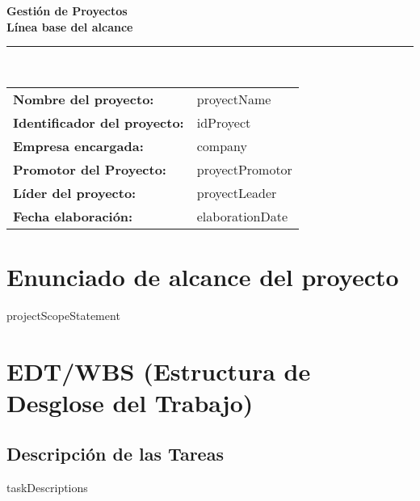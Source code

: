 \documentclass[11pt]{article}
\begin{document}
    \begin{center}
        \color{titlecolor}
        {\Huge\textbf{Gestión de Proyectos}}\\[1cm]
        {\large\textbf{Línea base del alcance}}\\[0.5cm]
        \rule{\textwidth}{1pt}\\[1.5cm]

        \begin{tabular}{>{\bfseries}ll}
            \textcolor{sectioncolor}{Nombre del proyecto:} & {{proyectName}} \\[0.4cm]
            \textcolor{sectioncolor}{Identificador del proyecto:} & {{idProyect}} \\[0.4cm]
            \textcolor{sectioncolor}{Empresa encargada:} & {{company}} \\[0.4cm]
            \textcolor{sectioncolor}{Promotor del Proyecto:} & {{proyectPromotor}} \\[0.4cm]
            \textcolor{sectioncolor}{Líder del proyecto:} & {{proyectLeader}} \\[0.4cm]
            \textcolor{sectioncolor}{Fecha elaboración:} & {{elaborationDate}} \\
        \end{tabular}
    \end{center}
    \thispagestyle{empty}
    \newpage

    \tableofcontents
    \thispagestyle{empty}
    \newpage

    \section{Enunciado de alcance del proyecto}
    \large
    {{projectScopeStatement}}
    \normalsize

    \section{EDT/WBS (Estructura de Desglose del Trabajo)}
    \begin{center}
    \end{center}


    \subsection{Descripción de las Tareas}
    \begin{description}
        {{taskDescriptions}}
    \end{description}
\end{document}
